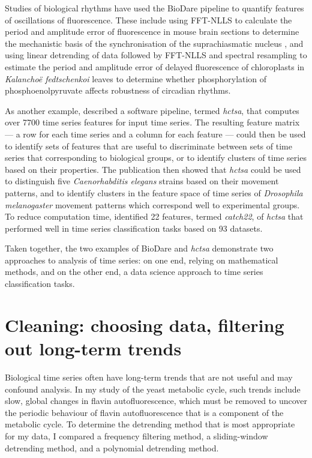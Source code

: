Studies of biological rhythms have used the BioDare pipeline to quantify features of oscillations of fluorescence.
These include using FFT-NLLS to calculate the period and amplitude error of fluorescence in mouse brain sections to determine the mechanistic basis of the synchronisation of the suprachiasmatic nucleus \parencite{hamnettVasoactiveIntestinalPeptide2019}, and using linear detrending of data followed by FFT-NLLS and spectral resampling to estimate the period and amplitude error of delayed fluorescence of chloroplasts in \textit{Kalancho\"{e} fedtschenkoi} leaves to determine whether phosphorylation of phosphoenolpyruvate affects robustness of circadian rhythms.

As another example, \textcite{fulcherHctsaComputationalFramework2017} described a software pipeline, termed \textit{hctsa}, that computes over 7700 time series features for input time series.
The resulting feature matrix --- a row for each time series and a column for each feature --- could then be used to identify sets of features that are useful to discriminate between sets of time series that corresponding to biological groups, or to identify clusters of time series based on their properties.
The publication then showed that \textit{hctsa} could be used to distinguish five \textit{Caenorhabditis elegans} strains based on their movement patterns, and to identify clusters in the feature space of time series of \textit{Drosophila melanogaster} movement patterns which correspond well to experimental groups.
To reduce computation time, \textcite{lubbaCatch22CAnonicalTimeseries2019} identified 22 features, termed \textit{catch22}, of \textit{hctsa} that performed well in time series classification tasks based on 93 datasets.

Taken together, the two examples of BioDare and \textit{hctsa} demonstrate two approaches to analysis of time series: on one end, relying on mathematical methods, and on the other end, a data science approach to time series classification tasks.


\section[Cleaning]{Cleaning: choosing data, filtering out long-term trends}
\label{sec:analysis-cleaning}

Biological time series often have long-term trends that are not useful and may confound analysis.
In my study of the yeast metabolic cycle, such trends include slow, global changes in flavin autofluorescence, which must be removed to uncover the periodic behaviour of flavin autofluorescence that is a component of the metabolic cycle.
To determine the detrending method that is most appropriate for my data, I compared a frequency filtering method, a sliding-window detrending method, and a polynomial detrending method.

